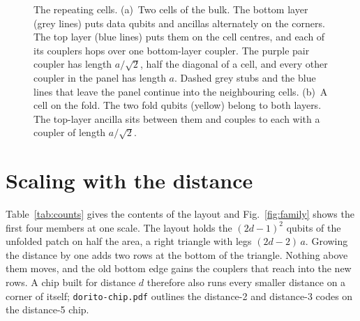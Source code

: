 \documentclass[11pt,a4paper]{article}
\begin{document}
\begin{figure}[t]
\centering

\caption{The repeating cells. (a)~Two cells of the bulk. The bottom layer (grey lines) puts data
qubits and ancillas alternately on the corners. The top layer (blue lines) puts them on the cell
centres, and each of its couplers hops over one bottom-layer coupler. The purple pair coupler
has length $a/\sqrt2$, half the diagonal of a cell, and every other coupler in the panel has
length $a$. Dashed grey stubs and
the blue lines that leave the panel continue into the neighbouring cells. (b)~A cell on the fold. The two fold qubits (yellow) belong to both
layers. The top-layer ancilla sits between them and couples to each with a coupler of length
$a/\sqrt2$.}
\label{fig:tile}
\end{figure}

\section{Scaling with the distance}

Table~\ref{tab:counts} gives the contents of the layout and Fig.~\ref{fig:family} shows the
first four members at one scale. The layout holds the $(2d-1)^2$ qubits of the unfolded patch on
half the area, a right triangle with legs $(2d-2)\,a$. Growing the distance by one adds two rows
at the bottom of the triangle. Nothing above them moves, and the old bottom edge gains the
couplers that reach into the new rows. A chip built for distance $d$ therefore also runs every
smaller distance on a corner of itself; \texttt{dorito-chip.pdf} outlines the distance-2 and
distance-3 codes on the distance-5 chip.
\end{document}
